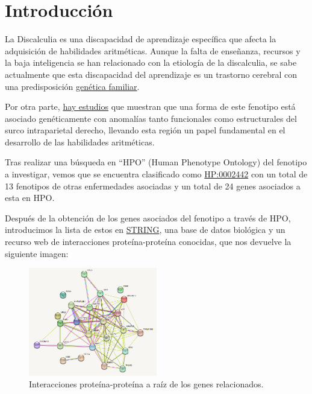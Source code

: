 \section{Introducción}

La Discalculia es una discapacidad de aprendizaje específica que afecta la adquisición de habilidades aritméticas. Aunque la falta de  enseñanza, recursos y la baja inteligencia se han relacionado con la etiología de la discalculia, se sabe actualmente que esta discapacidad del aprendizaje es un trastorno cerebral con una predisposición \href{https://doi.org/10.1016/S0887-8994(00)00258-7}{genética familiar}.

\hfill

Por otra parte, \href{https://doi.org/10.1016/S0896-6273(03)00670-6}{hay estudios} que muestran que una forma de este fenotipo está asociado genéticamente con anomalías tanto funcionales como estructurales del surco intraparietal derecho, llevando esta región un papel fundamental en el desarrollo de las habilidades aritméticas.

\hfill

Tras realizar una búsqueda en “HPO” (Human Phenotype Ontology) del fenotipo a investigar, vemos que se encuentra clasificado como \href{https://hpo.jax.org/app/browse/term/HP:0002442}{HP:0002442} con un total de 13 fenotipos de otras enfermedades asociadas y un total de 24 genes asociados a esta en HPO.

\hfill

Después de la obtención de los genes asociados del fenotipo a través de HPO, introducimos la lista de estos en \href{https://string-db.org}{STRING}, una base de datos biológica y un recurso web de interacciones proteína-proteína conocidas, que nos devuelve la siguiente imagen:

\begin{figure}[]
	\centering
	\includegraphics[width=0.50\textwidth]{figures/Gene-Relationships.PNG}
	\caption{Interacciones proteína-proteína a raíz de los genes relacionados. }
	\label{fig:example1}
\end{figure}


